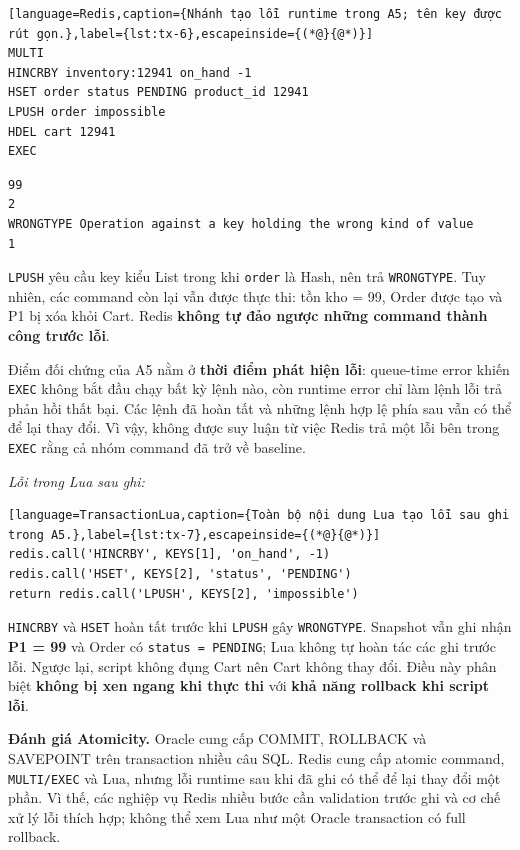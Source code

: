 \begin{lstlisting}[language=Redis,caption={Nhánh tạo lỗi runtime trong A5; tên key được rút gọn.},label={lst:tx-6},escapeinside={(*@}{@*)}]
MULTI
HINCRBY inventory:12941 on_hand -1
HSET order status PENDING product_id 12941
LPUSH order impossible
HDEL cart 12941
EXEC
\end{lstlisting}

\begingroup
{}\label{result:tx-5}
\nopagebreak[4]
\begin{Verbatim}
99
2
WRONGTYPE Operation against a key holding the wrong kind of value
1
\end{Verbatim}
\endgroup\par\smallskip
\texttt{LPUSH} yêu cầu key kiểu List trong khi \texttt{order} là Hash, nên trả \texttt{WRONGTYPE}. Tuy nhiên, các command còn lại vẫn được thực thi: tồn kho = 99, Order được tạo và P1 bị xóa khỏi Cart. Redis \textbf{không tự đảo ngược những command thành công trước lỗi}.

Điểm đối chứng của A5 nằm ở \textbf{thời điểm phát hiện lỗi}: queue-time error khiến \texttt{EXEC} không bắt đầu chạy bất kỳ lệnh nào, còn runtime error chỉ làm lệnh lỗi trả phản hồi thất bại. Các lệnh đã hoàn tất và những lệnh hợp lệ phía sau vẫn có thể để lại thay đổi. Vì vậy, không được suy luận từ việc Redis trả một lỗi bên trong \texttt{EXEC} rằng cả nhóm command đã trở về baseline.

\emph{Lỗi trong Lua sau ghi:}

\begin{lstlisting}[language=TransactionLua,caption={Toàn bộ nội dung Lua tạo lỗi sau ghi trong A5.},label={lst:tx-7},escapeinside={(*@}{@*)}]
redis.call('HINCRBY', KEYS[1], 'on_hand', -1)
redis.call('HSET', KEYS[2], 'status', 'PENDING')
return redis.call('LPUSH', KEYS[2], 'impossible')
\end{lstlisting}

\texttt{HINCRBY} và \texttt{HSET} hoàn tất trước khi \texttt{LPUSH} gây \texttt{WRONGTYPE}. Snapshot vẫn ghi nhận \textbf{P1 = 99} và Order có \texttt{status =\allowbreak{} PENDING}; Lua không tự hoàn tác các ghi trước lỗi. Ngược lại, script không đụng Cart nên Cart không thay đổi. Điều này phân biệt \textbf{không bị xen ngang khi thực thi} với \textbf{khả năng rollback khi script lỗi}.

\textbf{Đánh giá Atomicity.} Oracle cung cấp COMMIT, ROLLBACK và SAVEPOINT trên transaction nhiều câu SQL. Redis cung cấp atomic command, \texttt{MULTI/\allowbreak{}EXEC} và Lua, nhưng lỗi runtime sau khi đã ghi có thể để lại thay đổi một phần. Vì thế, các nghiệp vụ Redis nhiều bước cần validation trước ghi và cơ chế xử lý lỗi thích hợp; không thể xem Lua như một Oracle transaction có full rollback.


